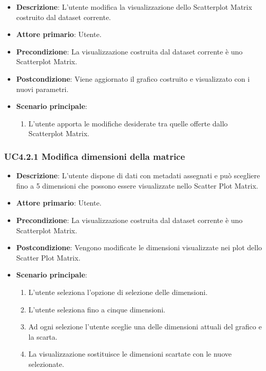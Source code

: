 \begin{itemize}
    \item \textbf{Descrizione}: L’utente modifica la visualizzazione dello Scatterplot Matrix
                                costruito dal dataset corrente.
	
    \item \textbf{Attore primario}: Utente.
    
    \item \textbf{Precondizione}:   La visualizzazione costruita dal dataset corrente è uno Scatterplot Matrix.

    \item \textbf{Postcondizione}:  Viene aggiornato il grafico costruito e visualizzato con i nuovi parametri.

	\item \textbf{Scenario principale}:
		\begin{enumerate}
            \item L'utente apporta le modifiche desiderate tra quelle offerte dallo Scatterplot Matrix.
        \end{enumerate}
\end{itemize}


\subsubsection{UC4.2.1 Modifica dimensioni della matrice}
\label{ssub:uc4.2.1}
\begin{itemize}
    \item \textbf{Descrizione}:     L’utente dispone di dati con metadati assegnati e può 
                                    scegliere fino a 5 dimensioni che possono essere visualizzate nello Scatter Plot 
                                    Matrix.
	
    \item \textbf{Attore primario}: Utente.
    
    \item \textbf{Precondizione}:   La visualizzazione costruita dal dataset corrente è uno Scatterplot Matrix.
    \item \textbf{Postcondizione}:  Vengono modificate le dimensioni visualizzate nei plot dello Scatter Plot Matrix.

	\item \textbf{Scenario principale}:
        \begin{enumerate}
            \item   L'utente seleziona l'opzione di selezione delle dimensioni.
            \item   L'utente seleziona fino a cinque dimensioni. 
           
            \item   Ad ogni selezione l'utente
                    sceglie una delle dimensioni attuali del grafico e la scarta.
           
            \item   La visualizzazione sostituisce le dimensioni scartate con le nuove selezionate.
        \end{enumerate}
\end{itemize}

